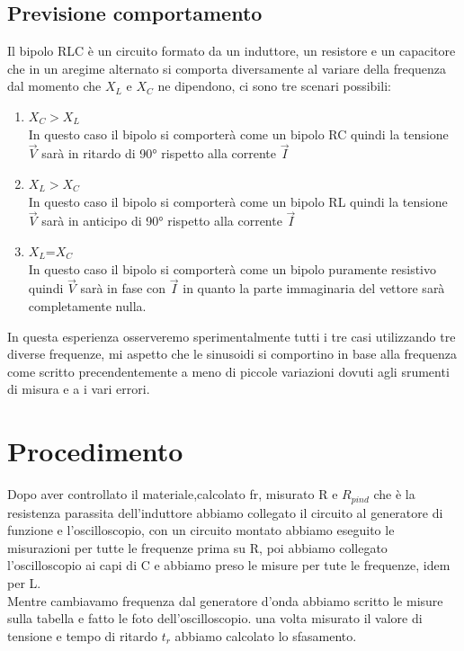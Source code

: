 \documentclass[12pt]{article}
\begin{document}
    \subsection{Previsione comportamento}
    Il bipolo RLC è un circuito formato da un induttore, un resistore e un capacitore che in un aregime alternato si 
    comporta diversamente al variare della frequenza dal momento che $X_L$ e $X_C$ ne dipendono, ci sono tre scenari possibili:
    \begin{enumerate}
        \item $X_C>X_L$\\
        In questo caso il bipolo si comporterà come un bipolo RC quindi la tensione $\vec{V}$ sarà in ritardo di 90° rispetto alla corrente $\vec{I}$
        \item $X_L>X_C$\\
        In questo caso il bipolo si comporterà come un bipolo RL quindi la tensione $\vec{V}$ sarà in anticipo di 90° rispetto alla corrente $\vec{I}$
        \item $X_L$=$X_C$\\
        In questo caso il bipolo si comporterà come un bipolo puramente resistivo quindi $\vec{V}$ sarà in fase con $\vec{I}$ in quanto la parte immaginaria del 
        vettore sarà completamente nulla.
        
    \end{enumerate}
    In questa esperienza osserveremo sperimentalmente tutti i tre casi utilizzando tre diverse frequenze, mi aspetto che 
    le sinusoidi si comportino in base alla frequenza come scritto precendentemente a meno di piccole variazioni dovuti agli srumenti di 
    misura e a i vari errori.
\section{Procedimento}
   Dopo aver controllato il materiale,calcolato fr, misurato R e $R_{pind}$ che è la resistenza parassita dell'induttore abbiamo collegato il circuito al generatore
   di funzione e l'oscilloscopio, con un circuito montato abbiamo eseguito le misurazioni per tutte le frequenze prima su R, poi abbiamo collegato l'oscilloscopio ai capi
   di C e abbiamo preso le misure per tute le frequenze, idem per L.\\
   Mentre cambiavamo frequenza dal generatore d'onda abbiamo scritto le misure sulla tabella e fatto le foto dell'oscilloscopio.
   una volta misurato il valore di tensione e tempo di ritardo \textit{$t_r$} abbiamo calcolato lo sfasamento. 
   
\end{document}

